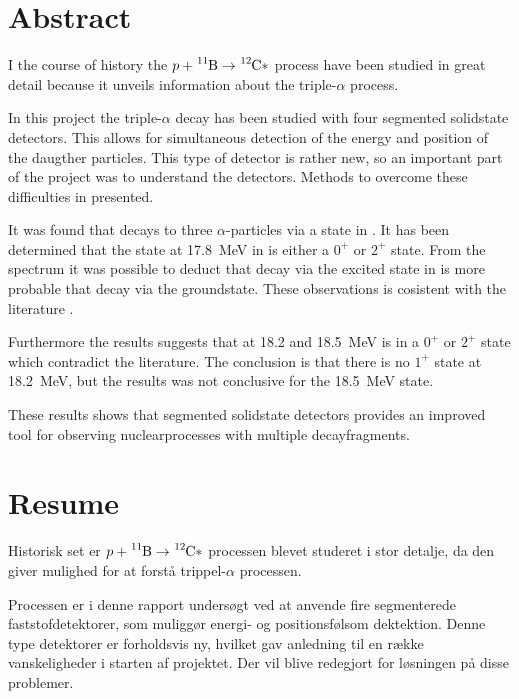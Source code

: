 \begingroup
\let\clearpage\relax
\chapter{Abstract}
\label{cha:abstract}
\vspace{-0.5\onelineskip}
I the course of history the $p + \Bor \rightarrow \Carb*$ process have been studied in great detail
because it unveils information about the triple-$\alpha$ process.

In this project the triple-$\alpha$ decay has been studied with four segmented solidstate detectors. This
allows for simultaneous detection of the energy and position of the daugther particles. This type of
detector is rather new, so an important part of the project was to understand the detectors. Methods to
overcome these difficulties in presented.

It was found that \Carb decays to three $\alpha$-particles via a state in \Be. It has
been determined that the state at \SI{17.8}{\MeV} in \Carb is either a $0^{+}$ or $2^{+}$
state. From the spectrum it was possible to deduct that decay via the excited state in \Be is more
probable that decay via the groundstate. These observations is cosistent with the literature \cite{States}.

Furthermore the results suggests that at \num{18.2} and \SI{18.5}{\MeV} \Carb is in a $0^{+}$ or
$2^{+}$ state which contradict the literature. The conclusion is that there is no $1^{+}$ state at
\SI{18.2}{\MeV}, but the results was not conclusive for the \SI{18.5}{\MeV} state.

These results shows that segmented solidstate detectors provides an improved tool for observing
nuclearprocesses with multiple decayfragments. 

\vspace{1.5\onelineskip}
\chapter{Resume}
\label{cha:resume}
\vspace{-0.5\onelineskip}

Historisk set er $p + \Bor \rightarrow \Carb*$ processen blevet studeret i stor detalje, da den
giver mulighed for at forstå trippel-$\alpha$ processen.

Processen er i denne rapport undersøgt ved at anvende fire segmenterede faststofdetektorer, som
muliggør energi- og positionsfølsom dektektion. Denne type detektorer er forholdsvis ny, hvilket gav
anledning til en række vanskeligheder i starten af projektet. Der vil blive redegjort for
løsningen på disse problemer. 


